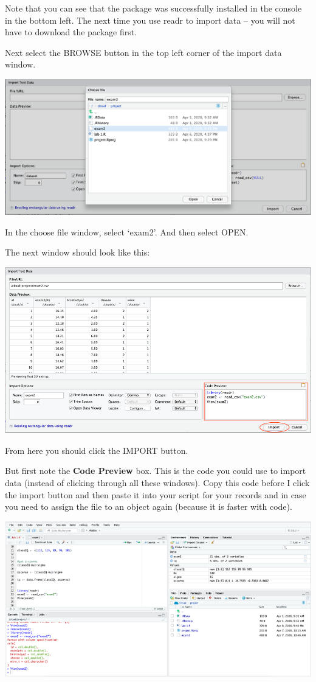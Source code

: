 \documentclass[
]{book}
\begin{document}
Note that you can see that the package was successfully installed in the console in the bottom left. The next time you use readr to import data -- you will not have to download the package first.

Next select the BROWSE button in the top left corner of the import data window.

\includegraphics{img/importbrowse.png}

In the choose file window, select `exam2'. And then select OPEN.

The next window should look like this:

\includegraphics{img/importwindow2.png}

From here you should click the IMPORT button.

But first note the \textbf{Code Preview} box. This is the code you could use to import data (instead of clicking through all these windows). Copy this code before I click the import button and then paste it into your script for your records and in case you need to assign the file to an object again (because it is faster with code).

\includegraphics{img/importcomplete.png}
\end{document}
